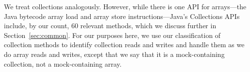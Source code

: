 

We treat collections analogously. However, while there is one API for arrays---the Java bytecode array load and array store instructions---Java's Collections APIs include, by our count, 60 relevant methods, which we discuss further in Section~\ref{sec:common}. For our purposes here, we use our classification of collection methods to identify collection reads and writes and handle them as we do array reads and writes, except that we say that it is a mock-containing collection, not a mock-containing array.


